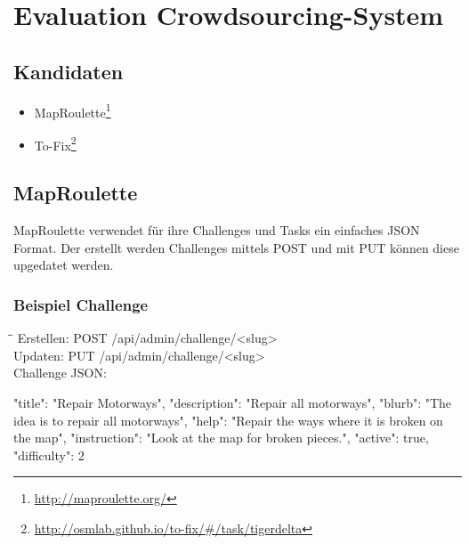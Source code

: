 \newpage
\section{Evaluation Crowdsourcing-System}
\subsection{Kandidaten}
\begin{itemize}
	\item MapRoulette\footnote{\url{http://maproulette.org/}} 
	\item To-Fix\footnote{\url{http://osmlab.github.io/to-fix/\#/task/tigerdelta}}
\end{itemize}

\subsection{MapRoulette}
MapRoulette verwendet für ihre Challenges und Tasks ein einfaches JSON Format. Der erstellt werden Challenges mittels POST und mit PUT können diese upgedatet werden.

\subsubsection{Beispiel Challenge}
\begin{tabbing}
    \hspace*{4cm}\=\hspace*{5cm}\= \kill
    Erstellen: \> POST /api/admin/challenge/<slug>  \\
    Updaten: \> PUT /api/admin/challenge/<slug> \\
    Challenge JSON: \\
\end{tabbing}		
\begin{python}
{
  "title": "Repair Motorways",
  "description": "Repair all motorways",
  "blurb": "The idea is to repair all motorways",
  "help": "Repair the ways where it is broken on the map",
  "instruction": "Look at the map for broken pieces.",
  "active": true,
  "difficulty": 2
}
\end{python}
\newpage
